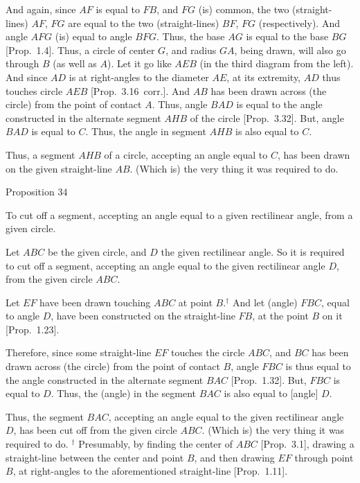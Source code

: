 And again, since $AF$ is equal to $FB$, and $FG$ (is) common, the two (straight-lines) $AF$, $FG$ are equal to the two (straight-lines) $BF$, $FG$ (respectively).
And angle $AFG$ (is) equal to angle $BFG$. Thus, the base $AG$ is equal to
the base $BG$ [Prop.~1.4]. Thus, a circle of center $G$, and radius $GA$,
being drawn, will also go through $B$ (as well as $A$). Let it go like $AEB$ (in the third diagram
from the left). And since $AD$ is at right-angles to the diameter $AE$, at its extremity, $AD$ thus touches circle $AEB$ [Prop.~3.16~corr.]. And $AB$ has been drawn across (the circle) from the point of contact $A$. Thus, angle $BAD$ is equal to the angle constructed in the alternate segment $AHB$ of the circle 
[Prop.~3.32]. But, angle $BAD$ is equal to $C$. Thus, the angle in segment
$AHB$ is also equal to $C$.

Thus, a segment $AHB$ of a circle, accepting an angle equal to $C$, has been
drawn on the given straight-line $AB$. (Which is) the very thing
it was required to do.


\begin{center}
{\large Proposition 34}
\end{center}

To cut off a segment, accepting an angle equal to a given rectilinear angle,
from a given circle.

\epsfysize=1.8in
\centerline{}

Let $ABC$ be the given circle, and $D$ the given rectilinear angle. So it is
required to cut off a segment, accepting an angle equal to the given
rectilinear angle $D$, from the given circle $ABC$.

Let $EF$ have been drawn touching $ABC$ at point $B$.$^\dag$ And let (angle)
$FBC$, equal to angle $D$, have been constructed  on the
straight-line $FB$, at the point $B$ on it [Prop.~1.23].

Therefore, since some straight-line $EF$ touches the circle $ABC$, and
$BC$ has been drawn across (the circle) from the point of contact $B$, angle
$FBC$ is thus equal to the angle constructed in the alternate segment
$BAC$ [Prop.~1.32]. But, $FBC$ is equal to $D$. Thus, the (angle)
in the segment $BAC$ is also equal to [angle] $D$.

Thus, the segment $BAC$, accepting an angle equal to the given
rectilinear angle $D$, has been cut off from the given circle $ABC$. (Which is)
the very thing it was required to do.
{\footnotesize \noindent$^\dag$ Presumably,
by finding the center of $ABC$ [Prop.~3.1], drawing a straight-line between
the center and point $B$, and then drawing $EF$ through point $B$, at right-angles
to the aforementioned straight-line [Prop.~1.11].}

